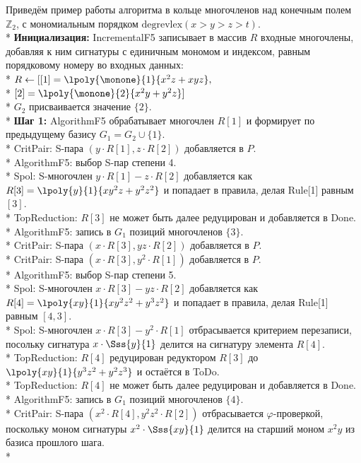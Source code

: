 Приведём пример работы алгоритма в кольце многочленов над конечным полем $\mathbb{Z}_{2}$, с мономиальным порядком $\mbox{degrevlex}(x>y>z>t)$.\\*
 \textbf{Инициализация:} IncrementalF5 записывает в массив $R$ входные многочлены, добавляя к ним сигнатуры с единичным мономом и индексом, равным порядковому номеру во входных данных:\\* $R\leftarrow[ [1]=\lpoly{\monone}{1}{x^{2}z+xyz},$\\*
$[2]=\lpoly{\monone}{2}{x^{2}y+y^{2}z}]$\\*
$G_2$ присваивается значение $\{2\}$.\\*
\textbf{Шаг 1:} AlgorithmF5 обрабатывает многочлен $R[1]$ и формирует по предыдущему базису $G_{1}=G_2\cup \{1\}$.\\*
CritPair: S-пара $(y\cdot R[1],z\cdot R[2])$ добавляется в $P$.\\*
AlgorithmF5: выбор S-пар степени 4.\\*
Spol: S-многочлен $y\cdot R[1] - z\cdot R[2]$ добавляется как $R[3]=\lpoly{y}{1}{xy^{2}z+y^{2}z^{2}}$ и попадает в правила, делая Rule[1] равным $[3]$.\\*
TopReduction: $R[3]$ не может быть далее редуцирован и добавляется в Done.\\*
AlgorithmF5: запись в $G_{1}$ позиций многочленов $\{3\}$.\\*
CritPair: S-пара $(x\cdot R[3],yz\cdot R[2])$ добавляется в $P$.\\*
CritPair: S-пара $(x\cdot R[3],y^{2}\cdot R[1])$ добавляется в $P$.\\*
AlgorithmF5: выбор S-пар степени 5.\\*
Spol: S-многочлен $x\cdot R[3] - yz\cdot R[2]$ добавляется как $R[4]=\lpoly{xy}{1}{xy^{2}z^{2}+y^{3}z^{2}}$ и попадает в правила, делая Rule[1] равным $[4, 3]$.\\*
Spol: S-многочлен $x\cdot R[3] - y^{2}\cdot R[1]$ отбрасывается критерием перезаписи, посольку сигнатура $x\cdot\Sss{y}{1}$ делится на сигнатуру элемента $R[4]$.\\*
TopReduction: $R[4]$ редуцирован редуктором $R[3]$ до $\lpoly{xy}{1}{y^{3}z^{2}+y^{2}z^{3}}$ и остаётся в ToDo.\\*
TopReduction: $R[4]$ не может быть далее редуцирован и добавляется в Done.\\*
AlgorithmF5: запись в $G_{1}$ позиций многочленов $\{4\}$.\\*
CritPair: S-пара $(x^{2}\cdot R[4],y^{2}z^{2}\cdot R[2])$  отбрасывается $\varphi$-проверкой, поскольку моном сигнатуры $x^{2}\cdot\Sss{xy}{1}$ делится на старший моном $x^{2}y$ из базиса прошлого шага.\\*
